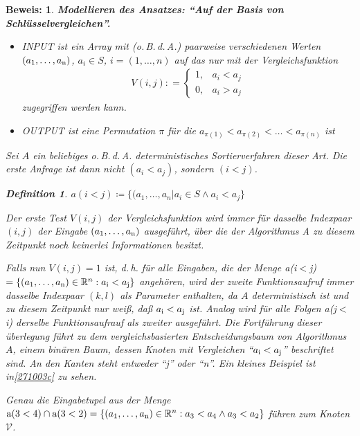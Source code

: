 \documentclass[ngerman,draft,parskip=half*,twoside]{scrreprt}
\theoremstyle{break}
\newtheorem{definition}{Definition}[chapter]
\theoremstyle{nonumberbreak}
\newtheorem{beweis}{Beweis:}
\newcommand*{\R}{\mathbb{R}}        %
\begin{document}
\begin{beweis}
\textbf{Modellieren des Ansatzes: "`Auf der Basis von Schlüsselvergleichen"'.}
  \begin{itemize}
  \item INPUT ist ein Array mit (o.\,B.\,d.\,A.) paarweise verschiedenen Werten 
  $ (a_1, \dots , a_{\textup{n}})$, $a_i \in S$, $i=(1, \dots, n)$ auf das nur
  mit der Vergleichsfunktion  \begin{gather*} V(i,j) : = \left\lbrace
  \begin{array}{ll} 1, & a_i < a_j \\ 0, & a_i > a_j \end{array} \right.\end{gather*}
  zugegriffen werden kann.
  \item OUTPUT ist eine Permutation $ \pi $ für die $ a_{\pi (1)} < a_{\pi (2)} < \dots < a_{\pi (n)} $ ist 
\end{itemize}

Sei $A$ ein beliebiges o.\,B.\,d.\,A. deterministisches
Sortierverfahren dieser Art.  Die erste Anfrage ist dann nicht $ (a_i
< a_j) $, sondern $ (i < j) $.

  \begin{definition}
  $a(i<j) \coloneqq  \lbrace (a_1, \dots , a_n \vert  a_i \in S \wedge a_i < a_j \rbrace $
  \end{definition}

%
Der erste Test $V(i,j)$ der Vergleichsfunktion wird immer für dasselbe Indexpaar $(i,j)$ der Eingabe $(a_1, \dots , a_{\textup{n}})$
ausgeführt, über die der Algorithmus A zu diesem Zeitpunkt noch keinerlei Informationen besitzt.

Falls nun $V(i,j)=1$ ist, d.\,h. für alle Eingaben, die der Menge a(i$<$j)$=\{(a_1,\ldots,a_{\textup{n}})\in \R^n :
a_{\textup{i}}<a_{\textup{j}}\}$ angehören, wird der zweite Funktionsaufruf immer dasselbe Indexpaar $(k,l)$ als Parameter
enthalten, da $A$ deterministisch ist und zu diesem Zeitpunkt nur weiß, daß $a_{\textup{i}}<a_{\textup{j}}$ ist. Analog wird für alle
Folgen a(j$<$i) derselbe Funktionsaufrauf als zweiter ausgeführt. Die Fortführung dieser überlegung führt zu dem vergleichsbasierten
Entscheidungsbaum von Algorithmus $A$, einem binären Baum, dessen Knoten mit Vergleichen "`$a_{\textup{i}}<a_{\textup{j}}$"' beschriftet
sind. An den Kanten steht entweder "`j"' oder "`n"'. Ein kleines Beispiel ist in\autoref{271003c} zu sehen.

Genau die Eingabetupel aus der Menge $\textup{a}(3<4)\cap \textup{a}(3<2)=\{(a_1,\ldots,a_{\textup{n}})\in \R^n : a_3<a_4 \wedge
a_3<a_2\}$ führen zum Knoten $\mathcal{V}$. 


\end{beweis}
\end{document}
